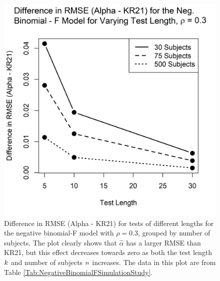 \documentclass[12pt,epsfig]{article}
\newcommand{\changed}[1]{\textcolor{black}{#1}}
\newcommand{\numsubjects}{\changed{n}}%
\newcommand{\testlength}{\changed{k}}%
\begin{document}
\begin{figure}[ht] \centering
\includegraphics{NBFPlot}
\caption{\color{black} Difference in RMSE (Alpha - KR21) for tests of different lengths for the negative binomial-F model with $\rho = 0.3$, grouped by number of subjects. The plot clearly shows that $\hat{\alpha}$ has a larger RMSE than KR21, but this effect decreases towards zero as both the test length $\testlength$ and number of subjects $\numsubjects$ increases. The data in this plot are from Table \ref{Tab:NegativeBinomialFSimulationStudy}.}
\label{Fig:NBFPlot}
\end{figure}
\end{document}
